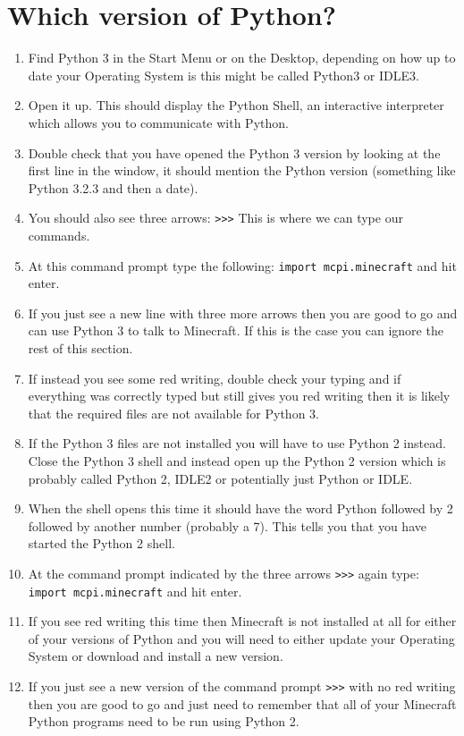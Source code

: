 \documentclass{geocraft-worksheet-multipage}
\begin{document}
\section*{Which version of Python?}
\begin{enumerate}
\item Find Python 3 in the Start Menu or on the Desktop, depending on how up
to date your Operating System is this might be called Python3 or
IDLE3. 
\item Open it up. This should display the Python Shell, an
interactive interpreter which allows you to communicate with
Python. 
\item Double check that you have opened the Python 3 version by
looking at the first line in the window, it should mention the Python
version (something like Python 3.2.3 and then a date). 
\item You should also see three arrows: \verb|>>>| This is where we can type
  our commands. 
\item At this command prompt type the following: 
\lstinline{import mcpi.minecraft} and hit enter.
\item If you just see a new line with three more arrows then you are
  good to go and can use Python 3 to talk to Minecraft. If this is the
  case you can ignore the rest of this section.
\item If instead you see some red writing, double check your typing
  and if everything was correctly typed but still gives you red
  writing then it is likely that the required files are not available
  for Python 3.
\item If the Python 3 files are not installed you will have to use
  Python 2 instead. Close the Python 3 shell and instead open up the
  Python 2 version which is probably called Python 2, IDLE2 or
  potentially just Python or IDLE.
\item When the shell opens this time it should have the word Python
  followed by 2 followed by another number (probably a 7). This tells
  you that you have started the Python 2 shell.
\item At the command prompt indicated by the three arrows \verb|>>>| again
  type: \lstinline{import mcpi.minecraft} and hit enter.
\item If you see red writing this time then Minecraft is not installed
  at all for either of your versions of Python and you will need to
  either update your Operating System or download and install a new
  version. 
\item If you just see a new version of the command prompt \verb|>>>| with
  no red writing then you are good to go and just need to remember
  that all of your Minecraft Python programs need to be run using
  Python 2.
\end{enumerate}
\end{document}
